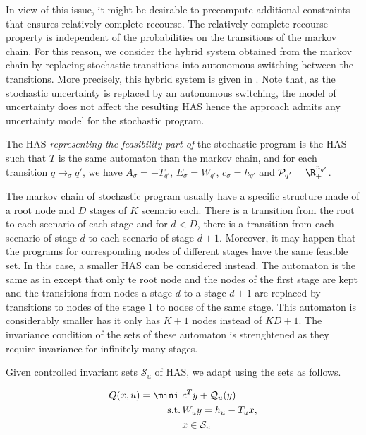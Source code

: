 \documentclass[11pt,twoside,a4paper,openright]{uclouvain-thesis}
\newcommand{\tr}{\to}
\newcommand{\trs}[1][\sigma]{\tr_{#1}}
\newcommand{\Ps}{\mathcal{P}}
\newcommand{\dtahas}{HAS}
\begin{document}
In view of this issue, it might be desirable to precompute additional constraints
that ensures relatively complete recourse.
The relatively complete recourse property is independent of the
probabilities on the transitions of the markov chain.
For this reason, we consider the hybrid system obtained from the markov chain by replacing
stochastic transitions into autonomous switching between the transitions.
More precisely, this hybrid system is given in .
Note that, as the stochastic uncertainty is replaced by an autonomous switching,
the model of uncertainty does not affect the resulting \dtahas{} hence
the approach admits any uncertainty model for the stochastic program.

\begin{mydef}
  \label{def:hsddp}
  The \dtahas{} \emph{representing the feasibility part of} the stochastic program 
  is the \dtahas{} such that $T$ is the same automaton than the markov chain,
  and for each transition $q \trs[\sigma] q'$,
  we have $A_\sigma = -T_{q'}$, $E_\sigma = W_{q'}$, $c_\sigma = h_{q'}$
  and $\Ps_{q'} = \R_+^{n_{q'}}$.
\end{mydef}

\begin{myrem}
  \label{rem:stages}
  The markov chain of stochastic program usually have a specific structure
  made of a root node and $D$ stages of $K$ scenario each.
  There is a transition from the root to each scenario of each stage
  and for $d < D$, there is a transition from each scenario of stage $d$
  to each scenario of stage $d + 1$.
  Moreover, it may happen that the programs  for
  corresponding nodes of different stages have the same feasible set.
  In this case, a smaller \dtahas{} can be considered instead.
  The automaton is the same as in  except that only
  te root node and the nodes of the first stage are kept and the
  transitions from nodes a stage $d$ to a stage $d+1$ are replaced by
  transitions to nodes of the stage 1 to nodes of the same stage.
  This automaton is considerably smaller has it only has $K + 1$ nodes
  instead of $KD + 1$.
  The invariance condition of the sets of these automaton is strenghtened
  as they require invariance for infinitely many stages.
\end{myrem}

Given controlled invariant sets $\mathcal{S}_u$ of \dtahas{},
we adapt  using the sets as follows.

\begin{myprog}
  \label{prog:ddpi}
  \begin{align*}
    Q(x, u) = \mini\,\, & c^T y + \mathcal{Q}_u(y)\\
    \text{s.t.} \,& W_u y = h_u - T_ux,\\
                & x \in \mathcal{S}_u
  \end{align*}
\end{myprog}
\end{document}
